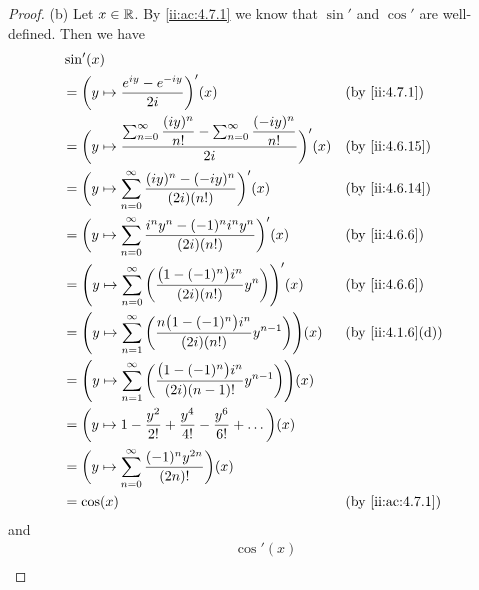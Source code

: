 \begin{proof}{(b)}
  Let \(x \in \mathbb{R}\).
  By \cref{ii:ac:4.7.1} we know that \(\sin'\) and \(\cos'\) are well-defined.
  Then we have
  \begin{align*}
     & \sin'(x)                                                                                                                                          \\
     & = \bigg(y \mapsto \dfrac{e^{i y} - e^{- i y}}{2i}\bigg)'(x)                                                                 &  & \by{ii:4.7.1}    \\
     & = \bigg(y \mapsto \dfrac{\sum_{n = 0}^\infty \dfrac{(i y)^n}{n!} - \sum_{n = 0}^\infty \dfrac{(- i y)^n}{n!}}{2i}\bigg)'(x) &  & \by{ii:4.6.15}   \\
     & = \bigg(y \mapsto \sum_{n = 0}^\infty \dfrac{(i y)^n - (- i y)^n}{(2i) (n!)}\bigg)'(x)                                      &  & \by{ii:4.6.14}   \\
     & = \bigg(y \mapsto \sum_{n = 0}^\infty \dfrac{i^n y^n - (-1)^n i^n y^n}{(2i) (n!)}\bigg)'(x)                                 &  & \by{ii:4.6.6}    \\
     & = \Bigg(y \mapsto \sum_{n = 0}^\infty \bigg(\dfrac{\big(1 - (-1)^n\big) i^n}{(2i) (n!)} y^n\bigg)\Bigg)'(x)                 &  & \by{ii:4.6.6}    \\
     & = \Bigg(y \mapsto \sum_{n = 1}^\infty \bigg(\dfrac{n \big(1 - (-1)^n\big) i^n}{(2i) (n!)} y^{n - 1}\bigg)\Bigg)(x)          &  & \by{ii:4.1.6}[d] \\
     & = \Bigg(y \mapsto \sum_{n = 1}^\infty \bigg(\dfrac{\big(1 - (-1)^n\big) i^n}{(2i) (n - 1)!} y^{n - 1}\bigg)\Bigg)(x)                              \\
     & = \bigg(y \mapsto 1 - \dfrac{y^2}{2!} + \dfrac{y^4}{4!} - \dfrac{y^6}{6!} + \dots\bigg)(x)                                                        \\
     & = \bigg(y \mapsto \sum_{n = 0}^\infty \dfrac{(-1)^n y^{2n}}{(2n)!}\bigg)(x)                                                                       \\
     & = \cos(x)                                                                                                                   &  & \by{ii:ac:4.7.1}
  \end{align*}
  and
  \begin{align*}
     & \cos'(x)                                                                                                                                         \\

\end{align*}
\end{proof}
